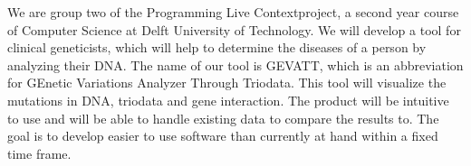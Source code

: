 We are group two of the Programming Live Contextproject, a second year course of Computer Science at Delft University of Technology. We will develop a tool for clinical geneticists, which will help to determine the diseases of a person by analyzing their DNA. The name of our tool is GEVATT, which is an abbreviation for GEnetic Variations Analyzer Through Triodata. This tool will visualize the mutations in DNA, triodata and gene interaction. The product will be intuitive to use and will be able to handle existing data to compare the results to. The goal is to develop easier to use software than currently at hand within a fixed time frame.